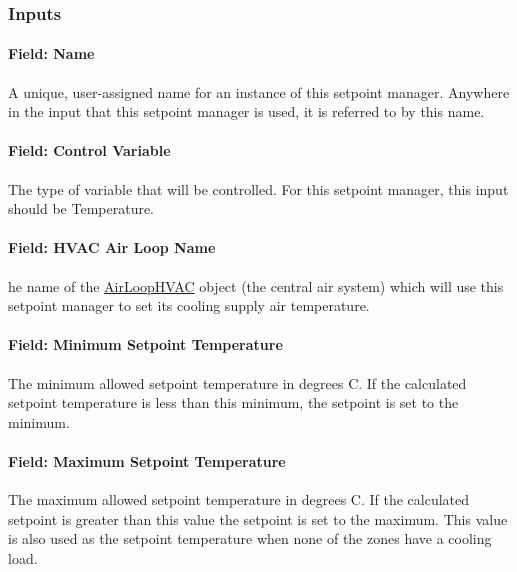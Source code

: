 \subsubsection{Inputs}\label{inputs-13-013}

\paragraph{Field: Name}\label{field-name-13-009}

A unique, user-assigned name for an instance of this setpoint manager. Anywhere in the input that this setpoint manager is used, it is referred to by this name.

\paragraph{Field: Control Variable}\label{field-control-variable-13}

The type of variable that will be controlled. For this setpoint manager, this input should be Temperature.

\paragraph{Field: HVAC Air Loop Name}\label{field-hvac-air-loop-name-3}

he name of the \hyperref[airloophvac]{AirLoopHVAC} object (the central air system) which will use this setpoint manager to set its cooling supply air temperature.

\paragraph{Field: Minimum Setpoint Temperature}\label{field-minimum-setpoint-temperature-3}

The minimum allowed setpoint temperature in degrees C. If the calculated setpoint temperature is less than this minimum, the setpoint is set to the minimum.

\paragraph{Field: Maximum Setpoint Temperature}\label{field-maximum-setpoint-temperature-3}

The maximum allowed setpoint temperature in degrees C. If the calculated setpoint is greater than this value the setpoint is set to the maximum. This value is also used as the setpoint temperature when none of the zones have a cooling load.

